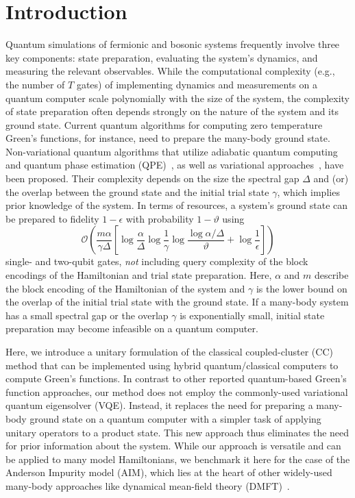 \documentclass[aip,reprint,table,xcdraw,usenames,dvipsnames]{revtex4-1}
\begin{document}
\maketitle

\section{Introduction} 
Quantum simulations of fermionic and bosonic systems frequently involve three key components: state preparation, evaluating the system's dynamics, and measuring the relevant observables. While the computational complexity (e.g., the number of $T$ gates) of implementing dynamics and measurements on a quantum computer scale polynomially with the size of the system, the complexity of state preparation often depends strongly on the nature of the system and its ground state. Current quantum algorithms for computing zero temperature Green's functions, for instance, need to prepare the many-body ground state. Non-variational quantum algorithms that utilize adiabatic quantum computing and quantum phase estimation (QPE)~\cite{Bauer2016}, as well as variational approaches~\cite{Wecker2015, Peruzzo2014,PhysRevResearch.2.033281}, have been proposed. Their complexity depends on the size the spectral gap $\Delta$ and (or) the overlap between the ground state and the initial trial state $\gamma$, which implies prior knowledge of the system. In terms of resources, a system's ground state can be prepared to fidelity $1-\epsilon$ with probability $1-\vartheta$ using\cite{Lin2020nearoptimalground} 
\begin{equation*}
 \mathcal{O} \left( \frac{m\alpha}{\gamma \Delta} \left[ \log \frac{\alpha}{\Delta} \log\frac{1}{\gamma} \log \frac{\log\alpha/\Delta}{\vartheta} + \log\frac{1}{\epsilon} \right] \right)
\end{equation*}
single- and two-qubit gates, \emph{not} including query complexity of the block encodings of the Hamiltonian and trial state preparation. Here, $\alpha$ and $m$ describe the block encoding of the Hamiltonian of the system and $\gamma$ is the lower bound on the overlap of the initial trial state with the ground state. If a many-body system has a small spectral gap or the overlap $\gamma$ is exponentially small, initial state preparation may become infeasible on a quantum computer.

Here, we introduce a unitary formulation of the classical coupled-cluster (CC) method that can be implemented using hybrid quantum/classical computers to compute Green's functions. In contrast to other reported quantum-based Green's function approaches\cite{Kosugi2020, Endo2020}, our method does not employ the commonly-used variational quantum eigensolver (VQE). Instead, it replaces the need for preparing a many-body ground state on a quantum computer with a simpler task of applying unitary operators to a product state. This new approach thus eliminates the need for prior information about the system. While our approach is versatile and can be applied to many model Hamiltonians, we benchmark it here for the case of the Anderson Impurity model (AIM), which lies at the heart of other widely-used many-body approaches like dynamical mean-field theory (DMFT)~\cite{Georges1992}.
\end{document}
